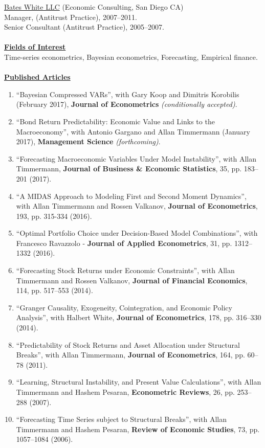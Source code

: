 \documentclass[12pt]{article}
\begin{document}
\underline{Bates White LLC} (Economic Consulting, San Diego CA)\\
Manager, (Antitrust Practice), 2007--2011.\\
Senior Consultant (Antitrust Practice), 2005--2007. \\ \\
\underline{\textbf{Fields of Interest}}\\
Time-series econometrics, Bayesian econometrics, Forecasting, Empirical finance.\\ \\
\underline{\textbf{Published Articles}}
\begin{enumerate}	
			\item ``Bayesian Compressed VARs'', with Gary Koop and Dimitris Korobilis (February 2017), \textbf{Journal of Econometrics} \textit{(conditionally accepted)}.
	\item ``Bond Return Predictability: Economic Value and Links to the Macroeconomy'', with Antonio Gargano and Allan Timmermann (January 2017), \textbf{Management Science} \textit{(forthcoming)}.
		  \item ``Forecasting Macroeconomic Variables Under Model Instability'', with Allan Timmermann, \textbf{Journal of Business \& Economic Statistics}, 35, pp. 183--201  (2017). 
	\item ``A MIDAS Approach to Modeling First and Second Moment Dynamics'', with Allan Timmermann and Rossen Valkanov, \textbf{Journal of Econometrics}, 193, pp. 315-334 (2016).
	\item ``Optimal Portfolio Choice under Decision-Based Model Combinations'', with Francesco Ravazzolo - \textbf{Journal of Applied Econometrics}, 31, pp. 1312--1332 (2016).
	\item ``Forecasting Stock Returns under Economic Constraints'', with Allan Timmermann and Rossen Valkanov, \textbf{Journal of Financial Economics}, 114, pp. 517--553 (2014). 
	\item ``Granger Causality, Exogeneity, Cointegration, and Economic Policy Analysis'', with Halbert White, \textbf{Journal of Econometrics}, 178, pp. 316--330 (2014). 
	\item ``Predictability of Stock Returns and Asset Allocation under Structural Breaks'', with Allan Timmermann, \textbf{Journal of Econometrics}, 164, pp. 60--78 (2011). 
	\item ``Learning, Structural Instability, and Present Value Calculations'', with Allan Timmermann and Hashem Pesaran, \textbf{Econometric Reviews}, 26, pp. 253--288 (2007). 
	\item ``Forecasting Time Series subject to Structural Breaks'', with Allan Timmermann and Hashem Pesaran, \textbf{Review of Economic Studies}, 73, pp. 1057--1084 (2006). 

    \setcounter{enumTemp}{\theenumi}
 \end{enumerate}
\end{document}
